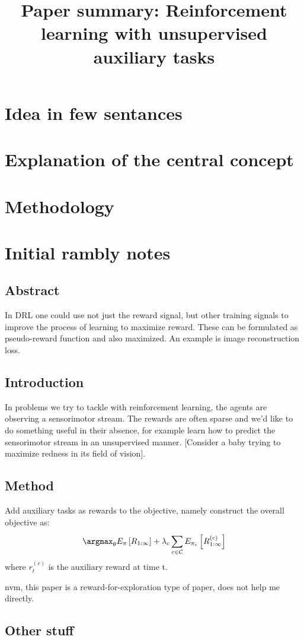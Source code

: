 \documentclass{article}
\title{Paper summary: Reinforcement learning with unsupervised auxiliary tasks}
\begin{document}
\maketitle


\section{Idea in few sentances}



\section{Explanation of the central concept}




\section{Methodology}


\section{Initial rambly notes}


\subsection{Abstract}
In DRL one could use not just the reward signal, but other training signals
to improve the process of learning to maximize reward.
These can be formulated as pseudo-reward function and also maximized.
An example is image reconstruction loss.


\subsection{Introduction}
In problems we try to tackle with reinforcement learning, 
the agents are observing a sensorimotor stream.
The rewards are often sparse and we'd like to do something useful in their absence,
for example learn how to predict the sensorimotor stream in an unsupervised manner.
[Consider a baby trying to maximize redness in its field of vision].


\subsection{Method}
Add auxiliary tasks as rewards to the objective, namely construct the overall objective as:
\begin{equation}
		\argmax_{\theta} E_{ \pi } \left[ R_{ 1:\infty } \right]  +
		\lambda_{ c } \sum_{c \in \mathcal{C}}^{} E_{ \pi_{ c } } \left[ R_{ 1:\infty }^{ (c) } \right] 
\end{equation}
where $ r_{ t }^{ (c) }  $ is the auxiliary reward at time t.

nvm, this paper is a reward-for-exploration type of paper, does not help me directly.

\subsection{Other stuff}
\end{document}
